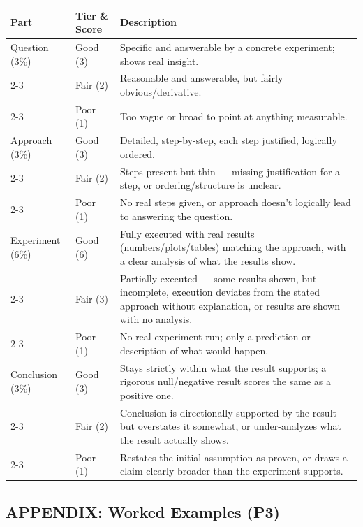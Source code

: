 \documentclass{article}
\begin{document}
\begin{center}
\footnotesize
\begin{tabular}{|p{3cm}|p{1.8cm}|p{9.3cm}|}
\hline
Part & Tier \& Score & Description \\
\hline\hline
Question (3\%) & Good (3) & Specific and answerable by a concrete experiment; shows real insight. \\
\cline{2-3}
 & Fair (2) & Reasonable and answerable, but fairly obvious/derivative. \\
\cline{2-3}
 & Poor (1) & Too vague or broad to point at anything measurable. \\
\hline\hline
Approach (3\%) & Good (3) & Detailed, step-by-step, each step justified, logically ordered. \\
\cline{2-3}
 & Fair (2) & Steps present but thin --- missing justification for a step, or ordering/structure is unclear. \\
\cline{2-3}
 & Poor (1) & No real steps given, or approach doesn't logically lead to answering the question. \\
\hline\hline
Experiment (6\%) & Good (6) & Fully executed with real results (numbers/plots/tables) matching the approach, with a clear analysis of what the results show. \\
\cline{2-3}
 & Fair (3) & Partially executed --- some results shown, but incomplete, execution deviates from the stated approach without explanation, or results are shown with no analysis. \\
\cline{2-3}
 & Poor (1) & No real experiment run; only a prediction or description of what would happen. \\
\hline\hline
Conclusion (3\%) & Good (3) & Stays strictly within what the result supports; a rigorous null/negative result scores the same as a positive one. \\
\cline{2-3}
 & Fair (2) & Conclusion is directionally supported by the result but overstates it somewhat, or under-analyzes what the result actually shows. \\
\cline{2-3}
 & Poor (1) & Restates the initial assumption as proven, or draws a claim clearly broader than the experiment supports. \\
\hline\hline
\end{tabular}
\end{center}

\clearpage
\subsection*{APPENDIX: Worked Examples (P3)}
\end{document}
